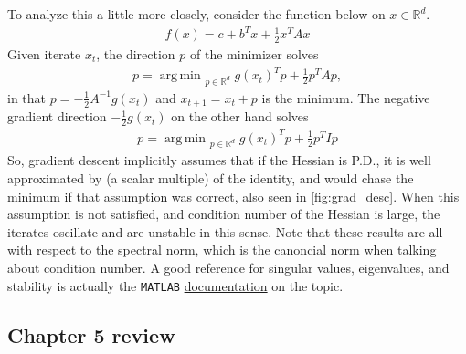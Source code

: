 \documentclass[11pt]{article}
\newcommand{\R}{\ensuremath{\mathbb R}}
\DeclareMathOperator*{\argmin}{arg\,min\ }
\theoremstyle{plain}
\theoremstyle{definition}
\theoremstyle{remark}
\begin{document}
To analyze this a little more closely, consider the function below on $x \in \R^d$.
\begin{align*}
    f(x) = c + b^T x + \frac{1}{2}x^T A x
\end{align*}
Given iterate $x_t$, the direction $p$ of the minimizer solves
\begin{align*}
    p = \argmin_{p \in \R^d} g(x_t)^T p + \frac{1}{2}p^T A p,
\end{align*}
in that $p = -\frac{1}{2}A^{-1} g(x_t)$ and $x_{t+1} = x_t + p$ is the minimum. The negative gradient direction $-\frac{1}{2}g(x_t)$ on the other hand solves
\begin{align*}
    p = \argmin_{p \in \R^d} g(x_t)^T p + \frac{1}{2}p^T I p
\end{align*}
So, gradient descent implicitly assumes that if the Hessian is P.D., it is well approximated by (a scalar multiple) of the identity, and would chase the minimum if that assumption was correct, also seen in \ref{fig:grad_desc}. When this assumption is not satisfied, and condition number of the Hessian is large, the iterates oscillate and are unstable in this sense. Note that these results are all with respect to the spectral norm, which is the canoncial norm when talking about condition number. A good reference for singular values, eigenvalues, and stability is actually the \texttt{MATLAB} \href{https://www.mathworks.com/content/dam/mathworks/mathworks-dot-com/moler/eigs.pdf}{documentation} on the topic.

\subsection*{Chapter 5 review}
\end{document}
